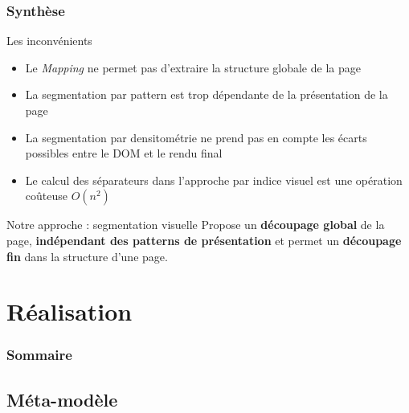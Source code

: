 \documentclass[9pt]{beamer}
\begin{document}
\begin{frame}
\frametitle{Synthèse}
\begin{block}{Les inconvénients}
	\begin{itemize}
		\item Le \emph{Mapping} ne permet pas d'extraire la structure globale de la page
		\item La segmentation par pattern est trop dépendante de la présentation de la page
		\item La segmentation par densitométrie ne prend pas en compte les écarts possibles entre le DOM et le rendu final
		\item Le calcul des séparateurs dans l'approche par indice visuel est une opération coûteuse $O(n^2)$
	\end{itemize}
\end{block}
\begin{block}{Notre approche : segmentation visuelle}
Propose un \textbf{découpage global} de la page, \textbf{indépendant des patterns de présentation} et permet un \textbf{découpage fin} dans la structure d'une page.
\end{block}
\end{frame}

\section{Réalisation}
\begin{frame}
  \frametitle{Sommaire}
\end{frame}

\subsection{Méta-modèle}
\end{document}
